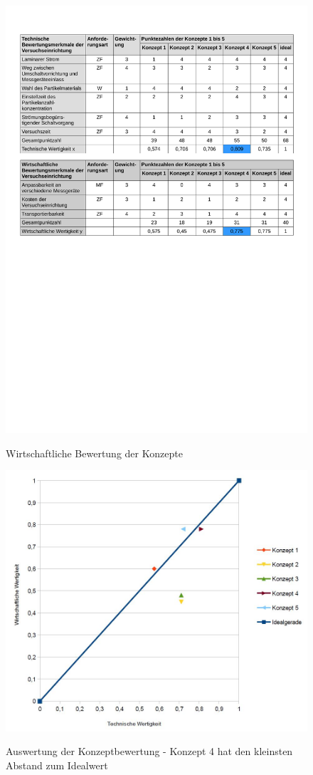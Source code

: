 \begin{figure}[H]
        \myfloatalign
        {\includegraphics[width=.8\linewidth]{gfx/conclusion/TabEvalThree.pdf}} \quad
        \caption[Wirtschaftliche Bewertung der Konzepte]
        {Wirtschaftliche Bewertung der Konzepte}
        \label{fig:TabEvalThree}
\end{figure}
\begin{figure}[H]
        \myfloatalign
        {\includegraphics[width=.6\linewidth]{gfx/conclusion/s_diagram.jpg}} \quad
        \caption[Auswertung der Konzeptbewertung - Konzept 4 hat den kleinsten Abstand zum Idealwert]
        {Auswertung der Konzeptbewertung - Konzept 4 hat den kleinsten Abstand zum Idealwert}
        \label{fig:diagram}
\end{figure}